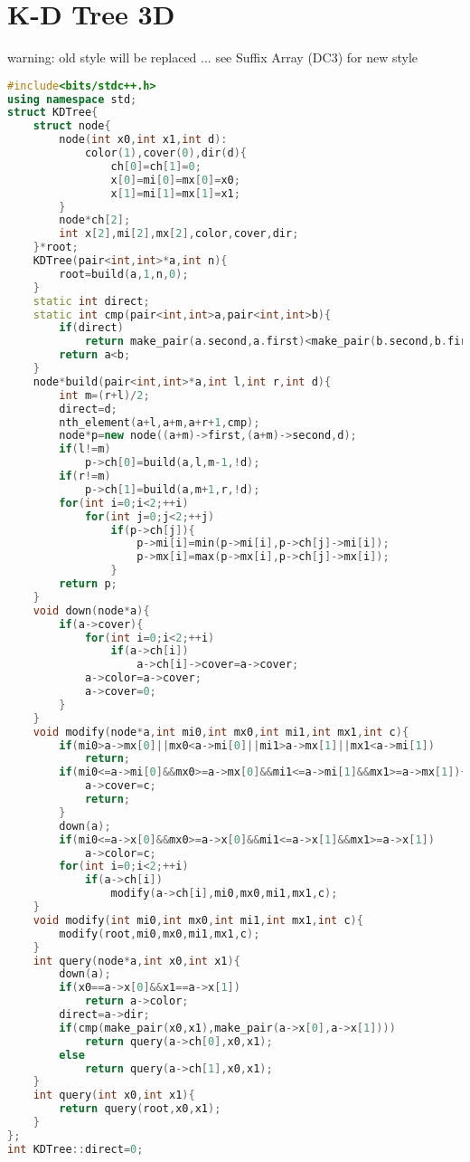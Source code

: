 \documentclass{book}
\begin{document}
\section{K-D Tree 3D}
warning: old style will be replaced ... see Suffix Array (DC3) for new style\begin{lstlisting}[language=C++,title={K-D Tree 3D.hpp (2467 bytes, 80 lines)}]
#include<bits/stdc++.h>
using namespace std;
struct KDTree{
    struct node{
        node(int x0,int x1,int d):
            color(1),cover(0),dir(d){
                ch[0]=ch[1]=0;
                x[0]=mi[0]=mx[0]=x0;
                x[1]=mi[1]=mx[1]=x1;
        }
        node*ch[2];
        int x[2],mi[2],mx[2],color,cover,dir;
    }*root;
    KDTree(pair<int,int>*a,int n){
        root=build(a,1,n,0);
    }
    static int direct;
    static int cmp(pair<int,int>a,pair<int,int>b){
        if(direct)
            return make_pair(a.second,a.first)<make_pair(b.second,b.first);
        return a<b;
    }
    node*build(pair<int,int>*a,int l,int r,int d){
        int m=(r+l)/2;
        direct=d;
        nth_element(a+l,a+m,a+r+1,cmp);
        node*p=new node((a+m)->first,(a+m)->second,d);
        if(l!=m)
            p->ch[0]=build(a,l,m-1,!d);
        if(r!=m)
            p->ch[1]=build(a,m+1,r,!d);
        for(int i=0;i<2;++i)
            for(int j=0;j<2;++j)
                if(p->ch[j]){
                    p->mi[i]=min(p->mi[i],p->ch[j]->mi[i]);
                    p->mx[i]=max(p->mx[i],p->ch[j]->mx[i]);
                }
        return p;
    }
    void down(node*a){
        if(a->cover){
            for(int i=0;i<2;++i)
                if(a->ch[i])
                    a->ch[i]->cover=a->cover;
            a->color=a->cover;
            a->cover=0;
        }
    }
    void modify(node*a,int mi0,int mx0,int mi1,int mx1,int c){
        if(mi0>a->mx[0]||mx0<a->mi[0]||mi1>a->mx[1]||mx1<a->mi[1])
            return;
        if(mi0<=a->mi[0]&&mx0>=a->mx[0]&&mi1<=a->mi[1]&&mx1>=a->mx[1]){
            a->cover=c;
            return;
        }
        down(a);
        if(mi0<=a->x[0]&&mx0>=a->x[0]&&mi1<=a->x[1]&&mx1>=a->x[1])
            a->color=c;
        for(int i=0;i<2;++i)
            if(a->ch[i])
                modify(a->ch[i],mi0,mx0,mi1,mx1,c);
    }
    void modify(int mi0,int mx0,int mi1,int mx1,int c){
        modify(root,mi0,mx0,mi1,mx1,c);
    }
    int query(node*a,int x0,int x1){
        down(a);
        if(x0==a->x[0]&&x1==a->x[1])
            return a->color;
        direct=a->dir;
        if(cmp(make_pair(x0,x1),make_pair(a->x[0],a->x[1])))
            return query(a->ch[0],x0,x1);
        else
            return query(a->ch[1],x0,x1);
    }
    int query(int x0,int x1){
        return query(root,x0,x1);
    }
};
int KDTree::direct=0;
\end{lstlisting}
\end{document}
